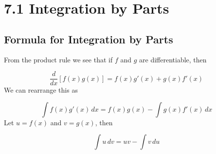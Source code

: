 %
%

\section*{7.1 Integration by Parts}

\subsection*{Formula for Integration by Parts}

\begin{definition}

From the product rule we see that if $f$ and $g$ are differentiable, then

\[ \frac{d}{dx}[f(x)g(x)] = f(x)g'(x) + g(x)f'(x) \]
We can rearrange this as

\[ \int \! f(x)g'(x) \, dx = f(x)g(x) - \int \! g(x)f'(x) \, dx \]
Let $u = f(x)$ and $v = g(x)$, then

\[ \int \! u \, dv = uv - \int \! v \, du \]

\end{definition}
